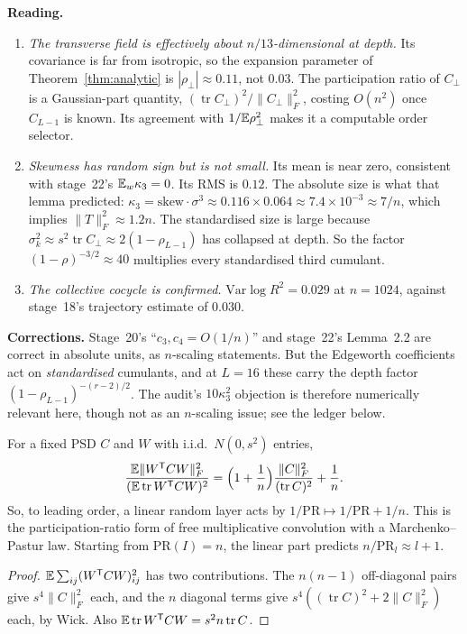 \noindent\textbf{Reading.}
\begin{enumerate}[label=(\roman*),leftmargin=1.6em,itemsep=1pt,topsep=1pt]
\item \emph{The transverse field is effectively about $n/13$-dimensional at depth.} Its covariance is far from
isotropic, so the expansion parameter of Theorem~\ref{thm:analytic} is $|\rho_\perp|\approx0.11$, not $0.03$. The
participation ratio of $C_\perp$ is a Gaussian-part quantity, $(\operatorname{tr}C_\perp)^2/\|C_\perp\|_F^2$, costing $O(n^2)$ once $C_{L-1}$ is
known. Its agreement with $1/\mathbb{E}\rho_\perp^2$ makes it a computable order selector.
\item \emph{Skewness has random sign but is not small.} Its mean is near zero, consistent with stage~22's
$\mathbb{E}_w\kappa_3=0$. Its RMS is $0.12$. The absolute size is what that lemma predicted:
$\kappa_3=\mathrm{skew}\cdot\sigma^3\approx0.116\times0.064\approx7.4\times10^{-3}\approx7/n$, which implies $\|T\|_F^2\approx1.2n$. The standardised size is
large because $\sigma_k^2\approx s^2\operatorname{tr}C_\perp\approx2(1-\rho_{L-1})$ has collapsed at depth. So the factor $(1-\rho)^{-3/2}\approx40$
multiplies every standardised third cumulant.
\item \emph{The collective cocycle is confirmed.} $\mathrm{Var}\log R^2=0.029$ at $n=1024$, against stage~18's
trajectory estimate of $0.030$.
\end{enumerate}

\noindent\textbf{Corrections.} Stage~20's ``$c_3,c_4=O(1/n)$'' and stage~22's Lemma~2.2 are correct in absolute
units, as $n$-scaling statements. But the Edgeworth coefficients act on \emph{standardised} cumulants, and at
$L=16$ these carry the depth factor $(1-\rho_{L-1})^{-(r-2)/2}$. The audit's $10\kappa_3^2$ objection is therefore
numerically relevant here, though not as an $n$-scaling issue; see the ledger below.

\begin{proposition}\label{prop:pr}
For a fixed PSD $C$ and $W$ with i.i.d.\ $N(0,s^2)$ entries,
\[
\frac{\mathbb{E}\|W^{\mathsf T} CW\|_F^2}{(\mathbb{E}\operatorname{tr}W^{\mathsf T} CW)^2}=\Big(1+\frac1n\Big)\frac{\|C\|_F^2}{(\operatorname{tr}C)^2}+\frac1n .
\]
So, to leading order, a linear random layer acts by $1/\mathrm{PR}\mapsto1/\mathrm{PR}+1/n$. This is the participation-ratio form of free
multiplicative convolution with a Marchenko--Pastur law. Starting from $\mathrm{PR}(I)=n$, the linear part predicts
$n/\mathrm{PR}_l\approx l+1$.
\end{proposition}
\begin{proof}
$\mathbb{E}\sum_{ij}(W^{\mathsf T} CW)_{ij}^2$ has two contributions. The $n(n-1)$ off-diagonal pairs give $s^4\|C\|_F^2$ each, and the
$n$ diagonal terms give $s^4((\operatorname{tr}C)^2+2\|C\|_F^2)$ each, by Wick. Also $\mathbb{E}\operatorname{tr}W^{\mathsf T} CW=s^2n\operatorname{tr}C$.
\end{proof}

